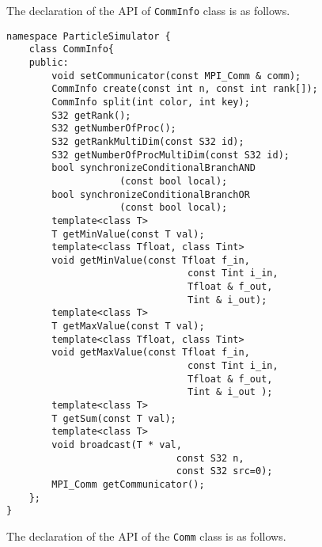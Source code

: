 
The declaration of the API of {\tt CommInfo} class is as follows.

\begin{lstlisting}[caption=CommunicationInformation]
namespace ParticleSimulator {
    class CommInfo{
    public:
        void setCommunicator(const MPI_Comm & comm);
        CommInfo create(const int n, const int rank[]);
        CommInfo split(int color, int key);
        S32 getRank();
        S32 getNumberOfProc();
        S32 getRankMultiDim(const S32 id);
        S32 getNumberOfProcMultiDim(const S32 id);
        bool synchronizeConditionalBranchAND
                    (const bool local);
        bool synchronizeConditionalBranchOR
                    (const bool local);
        template<class T>
        T getMinValue(const T val);
        template<class Tfloat, class Tint>
        void getMinValue(const Tfloat f_in,
                                const Tint i_in,
                                Tfloat & f_out,
                                Tint & i_out);
        template<class T>
        T getMaxValue(const T val);
        template<class Tfloat, class Tint>
        void getMaxValue(const Tfloat f_in,
                                const Tint i_in,
                                Tfloat & f_out,
                                Tint & i_out );
        template<class T>
        T getSum(const T val);
        template<class T>
        void broadcast(T * val,
                              const S32 n,
                              const S32 src=0);
        MPI_Comm getCommunicator();
    };
}
\end{lstlisting}


The declaration of the API of the  {\tt Comm} class is as follows.

